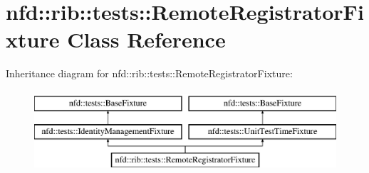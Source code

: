 \hypertarget{classnfd_1_1rib_1_1tests_1_1RemoteRegistratorFixture}{}\section{nfd\+:\+:rib\+:\+:tests\+:\+:Remote\+Registrator\+Fixture Class Reference}
\label{classnfd_1_1rib_1_1tests_1_1RemoteRegistratorFixture}
Inheritance diagram for nfd\+:\+:rib\+:\+:tests\+:\+:Remote\+Registrator\+Fixture\+:\begin{figure}[H]
\begin{center}
\leavevmode
\includegraphics[height=3.000000cm]{classnfd_1_1rib_1_1tests_1_1RemoteRegistratorFixture}
\end{center}
\end{figure}
